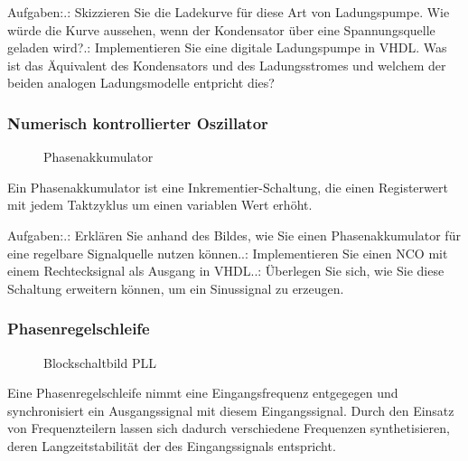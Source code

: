 \documentclass{article}
\begin{document}
Aufgaben:.: Skizzieren Sie die Ladekurve f\"ur diese Art von Ladungspumpe. Wie w\"urde die Kurve aussehen, wenn der Kondensator \"uber eine Spannungsquelle geladen wird?.: Implementieren Sie eine digitale Ladungspumpe in VHDL. Was ist das \"Aquivalent des Kondensators und des Ladungsstromes und welchem der beiden analogen Ladungsmodelle entpricht dies?

\subsubsection{Numerisch kontrollierter Oszillator}
\begin{figure}[H]
\begin{center}
\caption{Phasenakkumulator}
\end{center}
\end{figure}
Ein Phasenakkumulator ist eine Inkrementier-Schaltung, die einen Registerwert mit jedem Taktzyklus um einen variablen Wert erh\"oht.\citep{PA} \newline


Aufgaben:.: Erkl\"aren Sie anhand des Bildes, wie Sie einen Phasenakkumulator f\"ur eine regelbare Signalquelle nutzen k\"onnen..: Implementieren Sie einen NCO mit einem Rechtecksignal als Ausgang in VHDL..: \"Uberlegen Sie sich, wie Sie diese Schaltung erweitern k\"onnen, um ein Sinussignal zu erzeugen.

\subsubsection{Phasenregelschleife}
\begin{figure}[H]
\begin{center}
\caption{Blockschaltbild PLL}
\end{center}
\end{figure}
Eine Phasenregelschleife nimmt eine Eingangsfrequenz entgegegen und synchronisiert ein Ausgangssignal mit diesem Eingangssignal. Durch den Einsatz von Frequenzteilern lassen sich dadurch verschiedene Frequenzen synthetisieren, deren Langzeitstabilit\"at der des Eingangssignals entspricht. \newline
\end{document}
